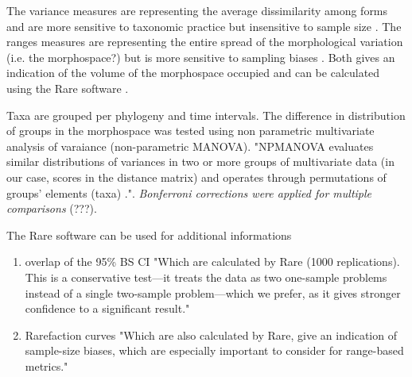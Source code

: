 \documentclass[a4paper,11pt]{article}
\begin{document}
The variance measures are representing the average dissimilarity among forms and are more sensitive to taxonomic practice but insensitive to sample size \citep{BIJ:BIJ45}.
The ranges measures are representing the entire spread of the morphological variation (i.e. the morphospace?) but is more sensitive to sampling biases \citep{BIJ:BIJ455}.
Both gives an indication of the volume of the morphospace occupied and can be calculated using the Rare software \citep{BIJ:BIJ455}.

Taxa are grouped per phylogeny and time intervals.
The difference in distribution of groups in the morphospace was tested using non parametric multivariate analysis of varaiance (non-parametric MANOVA).
"NPMANOVA evaluates similar distributions of variances in two or more groups of multivariate data (in our case, scores in the distance matrix) and operates through permutations of groups’ elements (taxa) \citep{AEC:AEC1070}."\citep{Brusatte12092008}.
\textit{Bonferroni corrections were applied for multiple comparisons} (???).

The Rare software \citep{BIJ:BIJ455} can be used for additional informations
\begin{enumerate}
\item{overlap of the 95\% BS CI}
"Which are calculated by Rare (1000 replications). This is a conservative test—it treats the data as two one-sample problems instead of a single two-sample problem—which we prefer, as it gives stronger confidence to a significant result." \citep{Brusatte12092008}
\item{Rarefaction curves}
"Which are also calculated by Rare, give an indication of sample-size biases, which are especially important to consider for range-based metrics."\citep{Brusatte12092008}
\end{enumerate}


\end{document}

